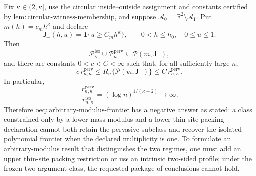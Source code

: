 Fix \(\kappa\in(2,\overline\kappa]\), use the circular inside--outside assignment and constants certified by \(\mathrm{lem:circular\text{-}witness\text{-}membership}\), and suppose \(\mathcal A_0=\mathbb R^2\setminus\mathcal A_1\).  Put \(m(h)=c_mh^\kappa\) and declare
\[
 \mathsf J_{-}(h,u)=\mathbf 1\{u\ge C_mh^\kappa\},
 \qquad 0<h\le h_0,\quad 0\le u\le1.
\]
Then
\[
 \mathcal P_{\kappa}^{\mathrm{iso}}\cup
 \mathcal P_{\kappa}^{\mathrm{perv}}
 \subseteq \mathcal P(m,\mathsf J_{-}),
\]
and there are constants \(0<c<C<\infty\) such that, for all sufficiently large \(n\),
\[
 c\,r_{n,\kappa}^{\mathrm{perv}}
 \le R_n\{\mathcal P(m,\mathsf J_{-})\}
 \le C\,r_{n,\kappa}^{\mathrm{perv}}.
\]
In particular,
\[
 \frac{r_{n,\kappa}^{\mathrm{perv}}}
 {r_{n,\kappa}^{\mathrm{iso}}}
 =(\log n)^{1/(\kappa+2)}\longrightarrow\infty.
\]
Therefore \(\mathrm{oeq:arbitrary\text{-}modulus\text{-}frontier}\) has a negative answer as stated: a class constrained only by a lower mass modulus and a lower thin-site packing declaration cannot both retain the pervasive subclass and recover the isolated polynomial frontier when the declared multiplicity is one.  To formulate an arbitrary-modulus result that distinguishes the two regimes, one must add an upper thin-site packing restriction or use an intrinsic two-sided profile; under the frozen two-argument class, the requested package of conclusions cannot hold.